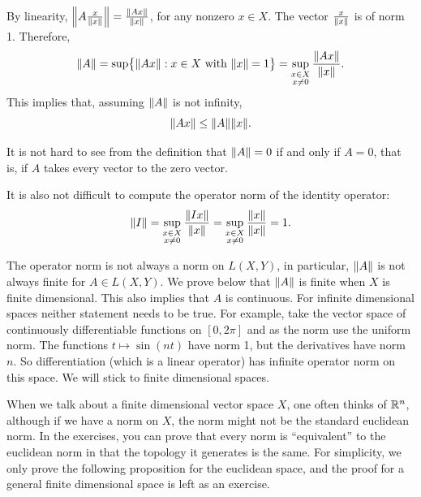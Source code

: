 By linearity,
$\left\lVert {A \frac{x}{\lVert {x} \rVert}} \right\rVert = \frac{\lVert {Ax} \rVert}{\lVert {x} \rVert}$,
for any nonzero $x \in X$.
The vector $\frac{x}{\lVert {x} \rVert}$ is of norm 1.
Therefore,
\begin{equation*}
\lVert {A} \rVert =
\sup \bigl\{ \lVert {Ax} \rVert : x \in X ~ \text{with} ~ \lVert {x} \rVert = 1 \bigr\}
=
\sup_{\substack{x \in X\\x\neq 0}} \frac{\lVert {Ax} \rVert}{\lVert {x} \rVert} .
\end{equation*}
This implies that, assuming $\lVert {A} \rVert$ is not infinity,
\begin{equation*}
\lVert {Ax} \rVert \leq \lVert {A} \rVert  \lVert {x} \rVert .
\end{equation*}

It is not hard to see from the definition that $\lVert {A} \rVert = 0$ if and
only if $A = 0$, that is, if $A$ takes every vector to the zero vector.

It is also not difficult to compute the operator norm of the identity operator:
\begin{equation*}
\lVert {I} \rVert =
\sup_{\substack{x \in X\\x\neq 0}} \frac{\lVert {Ix} \rVert}{\lVert {x} \rVert} 
=
\sup_{\substack{x \in X\\x\neq 0}} \frac{\lVert {x} \rVert}{\lVert {x} \rVert} 
= 1.
\end{equation*}

The operator norm is not always a norm on $L(X,Y)$, in particular,
$\lVert {A} \rVert$ is not always finite for $A \in L(X,Y)$.
We prove below that $\lVert {A} \rVert$ is finite when $X$ is finite dimensional.
This also implies that $A$ is continuous.
For infinite dimensional spaces neither statement needs to be true.
For example,
take the vector space of continuously differentiable functions on $[0,2\pi]$
and as the norm use the uniform norm.  The functions
$t \mapsto \sin(n t)$ have norm 1, but the derivatives have norm $n$.  So
differentiation (which is a linear operator) has infinite operator norm on this
space.  We will stick to finite dimensional spaces.

When we talk about a finite dimensional vector space $X$, one often thinks of
${\mathbb{R}}^n$, although if we have a norm on $X$, the norm might not be
the standard euclidean norm.  In the exercises, you can prove that
every norm is ``equivalent'' to the euclidean norm in that the
topology it generates is the same.  For simplicity, we only prove the
following proposition for the euclidean space, and the proof for a general
finite dimensional space is left as an exercise.

